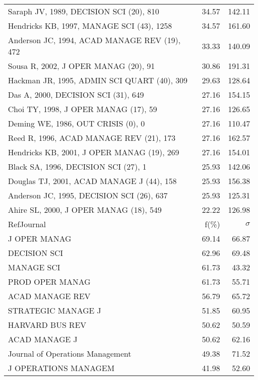 \documentclass[a4paper,11pt]{report}
\begin{document}
\begin{landscape}
\begin{table}[!ht]
{\begin{tabular}{|l r r|}
Saraph JV, 1989, DECISION SCI (20), 810 & 34.57 & 142.11\\
Hendricks KB, 1997, MANAGE SCI (43), 1258 & 34.57 & 161.60\\
Anderson JC, 1994, ACAD MANAGE REV (19), 472 & 33.33 & 140.09\\
Sousa R, 2002, J OPER MANAG (20), 91 & 30.86 & 191.31\\
Hackman JR, 1995, ADMIN SCI QUART (40), 309 & 29.63 & 128.64\\
Das A, 2000, DECISION SCI (31), 649 & 27.16 & 154.15\\
Choi TY, 1998, J OPER MANAG (17), 59 & 27.16 & 126.65\\
Deming WE, 1986, OUT CRISIS (0), 0 & 27.16 & 110.47\\
Reed R, 1996, ACAD MANAGE REV (21), 173 & 27.16 & 162.57\\
Hendricks KB, 2001, J OPER MANAG (19), 269 & 27.16 & 154.01\\
Black SA, 1996, DECISION SCI (27), 1 & 25.93 & 142.06\\
Douglas TJ, 2001, ACAD MANAGE J (44), 158 & 25.93 & 156.38\\
Anderson JC, 1995, DECISION SCI (26), 637 & 25.93 & 125.31\\
Ahire SL, 2000, J OPER MANAG (18), 549 & 22.22 & 126.98\\
\hline
\hline
RefJournal & f(\%) & $\sigma$\\
\hline
J OPER MANAG & 69.14 & 66.87\\
DECISION SCI & 62.96 & 69.48\\
MANAGE SCI & 61.73 & 43.32\\
PROD OPER MANAG & 61.73 & 55.71\\
ACAD MANAGE REV & 56.79 & 65.72\\
STRATEGIC MANAGE J & 51.85 & 60.95\\
HARVARD BUS REV & 50.62 & 50.59\\
ACAD MANAGE J & 50.62 & 62.16\\
Journal of Operations Management & 49.38 & 71.52\\
J OPERATIONS MANAGEM & 41.98 & 52.60\\
\hline
\end{tabular}
}
\end{table}

\end{landscape}
\end{document}
